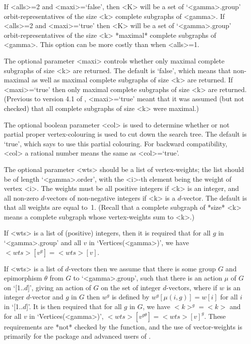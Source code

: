 If <alls>=2 and <maxi>=`false', then <K> will be a set of `<gamma>.group'
orbit-representatives of the size <k> complete subgraphs of <gamma>.
If <alls>=2 and <maxi>=`true' then <K> will be a set of `<gamma>.group'
orbit-representatives of the size <k> *maximal* complete subgraphs
of <gamma>.  This option can be more costly than when <alls>=1.

The optional parameter <maxi> controls whether only maximal complete
subgraphs of size <k> are returned.  The default is `false', which means
that non-maximal as well as maximal complete subgraphs of size <k> are
returned. If <maxi>=`true' then only maximal complete subgraphs of size
<k> are returned. (Previous to version 4.1 of {\GRAPE}, <maxi>=`true'
meant that it was assumed (but not checked) that all complete subgraphs
of size <k> were maximal.)

The optional boolean parameter <col> is used to determine whether or not
partial proper vertex-colouring is used to cut down the search tree. The
default is `true', which says to use this partial colouring.  For backward
compatibility, <col> a rational number means the same as <col>=`true'.

The optional parameter <wts> should be a list of vertex-weights; the list
should be of length `<gamma>.order', with the <i>-th element being the
weight of vertex <i>. The weights must be all positive integers if <k>
is an integer, and all non-zero $d$-vectors of non-negative integers
if <k> is a $d$-vector. The default is that all weights are equal to~1.
(Recall that a complete subgraph of *size* <k> means a complete subgraph
whose vertex-weights sum to <k>.)

If <wts> is a list of (positive) integers, then it is required that
for all $g$ in `<gamma>.group' and all $v$ in `Vertices(<gamma>)',
we have $<wts>[v^g]=<wts>[v]$.

If <wts> is a list of $d$-vectors then we assume that there is some group
$G$ and epimorphism $\theta$ from $G$ to `<gamma>.group', such that there
is an action $\mu$ of $G$ on `[1..$d$]', giving an action of $G$ on the
set of integer $d$-vectors, where if $w$ is an integer $d$-vector and
$g$ in $G$ then $w^g$ is defined by $w^g[\mu(i,g)]=w[i]$ for all $i$
in `[1..$d$]'. It is then required that for all $g$ in $G$, we have
$<k>^g=<k>$ and for all $v$ in `Vertices(<gamma>)', $<wts>[v^{g\theta}]
= <wts>[v]^g$.  These requirements are *not* checked by the function,
and the use of vector-weights is primarily for the {\DESIGN} package
and advanced users of {\GRAPE}.

